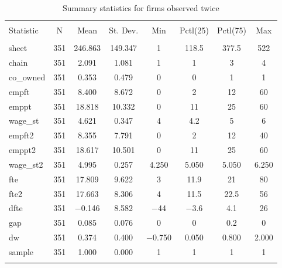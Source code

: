 
\begin{table}[!htbp] \centering 
  \caption{Summary statistics for firms observed twice} 
  \label{Tab:Summary_proper} 
\begin{tabular}{@{\extracolsep{5pt}}lccccccc} 
\\[-1.8ex]\hline 
\hline \\[-1.8ex] 
Statistic & \multicolumn{1}{c}{N} & \multicolumn{1}{c}{Mean} & \multicolumn{1}{c}{St. Dev.} & \multicolumn{1}{c}{Min} & \multicolumn{1}{c}{Pctl(25)} & \multicolumn{1}{c}{Pctl(75)} & \multicolumn{1}{c}{Max} \\ 
\hline \\[-1.8ex] 
sheet & 351 & 246.863 & 149.347 & 1 & 118.5 & 377.5 & 522 \\ 
chain & 351 & 2.091 & 1.081 & 1 & 1 & 3 & 4 \\ 
co\_owned & 351 & 0.353 & 0.479 & 0 & 0 & 1 & 1 \\ 
empft & 351 & 8.400 & 8.672 & 0 & 2 & 12 & 60 \\ 
emppt & 351 & 18.818 & 10.332 & 0 & 11 & 25 & 60 \\ 
wage\_st & 351 & 4.621 & 0.347 & 4 & 4.2 & 5 & 6 \\ 
empft2 & 351 & 8.355 & 7.791 & 0 & 2 & 12 & 40 \\ 
emppt2 & 351 & 18.617 & 10.501 & 0 & 11 & 25 & 60 \\ 
wage\_st2 & 351 & 4.995 & 0.257 & 4.250 & 5.050 & 5.050 & 6.250 \\ 
fte & 351 & 17.809 & 9.622 & 3 & 11.9 & 21 & 80 \\ 
fte2 & 351 & 17.663 & 8.306 & 4 & 11.5 & 22.5 & 56 \\ 
dfte & 351 & $-$0.146 & 8.582 & $-$44 & $-$3.6 & 4.1 & 26 \\ 
gap & 351 & 0.085 & 0.076 & 0 & 0 & 0.2 & 0 \\ 
dw & 351 & 0.374 & 0.400 & $-$0.750 & 0.050 & 0.800 & 2.000 \\ 
sample & 351 & 1.000 & 0.000 & 1 & 1 & 1 & 1 \\ 
\hline \\[-1.8ex] 
\end{tabular} 
\end{table} 
